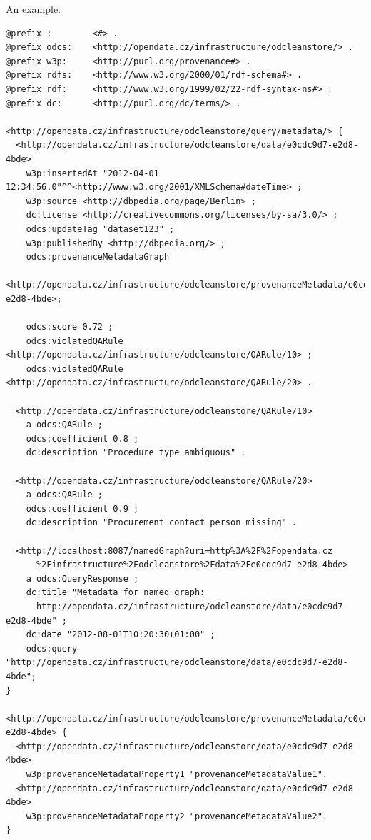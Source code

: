 {\pagebreak[3]

An example:

\begin{lstlisting}[caption={Example of metadata query response in TriG},label=lst:metadataTrigResponse]
@prefix :        <#> .
@prefix odcs:    <http://opendata.cz/infrastructure/odcleanstore/> .
@prefix w3p:     <http://purl.org/provenance#> .
@prefix rdfs:    <http://www.w3.org/2000/01/rdf-schema#> .
@prefix rdf:     <http://www.w3.org/1999/02/22-rdf-syntax-ns#> .
@prefix dc:      <http://purl.org/dc/terms/> .

<http://opendata.cz/infrastructure/odcleanstore/query/metadata/> {
  <http://opendata.cz/infrastructure/odcleanstore/data/e0cdc9d7-e2d8-4bde>
    w3p:insertedAt "2012-04-01 12:34:56.0"^^<http://www.w3.org/2001/XMLSchema#dateTime> ;
    w3p:source <http://dbpedia.org/page/Berlin> ;
    dc:license <http://creativecommons.org/licenses/by-sa/3.0/> ;
    odcs:updateTag "dataset123" ;
    w3p:publishedBy <http://dbpedia.org/> ;
    odcs:provenanceMetadataGraph
      <http://opendata.cz/infrastructure/odcleanstore/provenanceMetadata/e0cdc9d7-e2d8-4bde>;
        
    odcs:score 0.72 ;
    odcs:violatedQARule <http://opendata.cz/infrastructure/odcleanstore/QARule/10> ;
    odcs:violatedQARule <http://opendata.cz/infrastructure/odcleanstore/QARule/20> .  

  <http://opendata.cz/infrastructure/odcleanstore/QARule/10>
    a odcs:QARule ;
    odcs:coefficient 0.8 ;
    dc:description "Procedure type ambiguous" .
        
  <http://opendata.cz/infrastructure/odcleanstore/QARule/20>
    a odcs:QARule ;
    odcs:coefficient 0.9 ;
    dc:description "Procurement contact person missing" .
        
  <http://localhost:8087/namedGraph?uri=http%3A%2F%2Fopendata.cz
      %2Finfrastructure%2Fodcleanstore%2Fdata%2Fe0cdc9d7-e2d8-4bde>
    a odcs:QueryResponse ;
    dc:title "Metadata for named graph:
      http://opendata.cz/infrastructure/odcleanstore/data/e0cdc9d7-e2d8-4bde" ;
    dc:date "2012-08-01T10:20:30+01:00" ;
    odcs:query "http://opendata.cz/infrastructure/odcleanstore/data/e0cdc9d7-e2d8-4bde";
}
    
<http://opendata.cz/infrastructure/odcleanstore/provenanceMetadata/e0cdc9d7-e2d8-4bde> {
  <http://opendata.cz/infrastructure/odcleanstore/data/e0cdc9d7-e2d8-4bde>
    w3p:provenanceMetadataProperty1 "provenanceMetadataValue1".
  <http://opendata.cz/infrastructure/odcleanstore/data/e0cdc9d7-e2d8-4bde>
    w3p:provenanceMetadataProperty2 "provenanceMetadataValue2".
}
\end{lstlisting}

}
